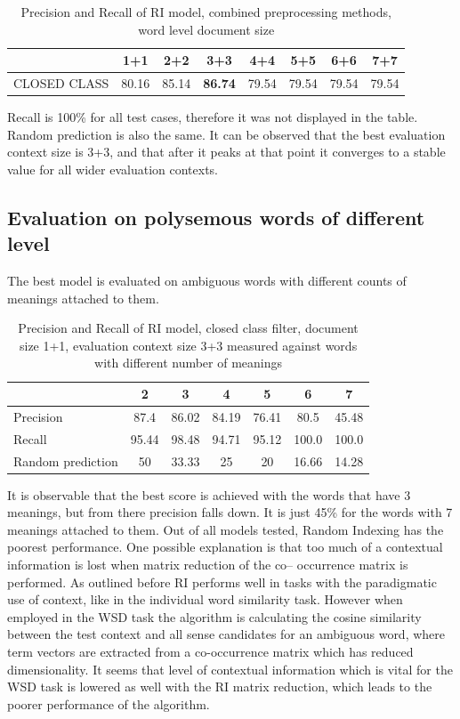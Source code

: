 \begin{table}[h!]
\begin{tabular}{ l | c c c c c c c}
    &  1+1 & 2+2 & 3+3 & 4+4 & 5+5 & 6+6 & 7+7 \\
\hline
CLOSED CLASS  & 80.16 & 85.14 & \textbf{86.74} & 79.54 & 79.54& 79.54& 79.54\\
\end{tabular}
\caption{Precision and Recall of RI model,  combined preprocessing methods, word level document size}
\end{table} 

Recall is 100\% for all test cases, therefore it was not displayed in the table. Random prediction is also the same. 
It can be observed that the best evaluation context size is 3+3, and that after it peaks at that point it converges to a stable value for all wider evaluation contexts. 



\subsection{Evaluation on polysemous words of different level}
The best model is evaluated on ambiguous words with 
different counts of meanings attached to them.

\begin{table}[h!]
\begin{tabular}{ l | c c c c c c  }
     & 2 & 3 & 4 & 5 & 6& 7     \\
 \hline
Precision & 87.4 & 86.02 & 84.19 & 76.41 &80.5 & 45.48 \\
Recall   & 95.44 & 98.48 & 94.71 & 95.12 & 100.0 &100.0    \\
Random prediction    & 50 & 33.33 & 25 & 20 & 16.66 & 14.28      \\
\end{tabular}
\caption{Precision and Recall of RI model, closed class filter, document size 1+1, evaluation context size 3+3 measured against words with different number of meanings}
\end{table} 
 It is observable that the best score is achieved with the words that have 3 meanings, but from there precision falls down. It is 
just 45\% for the words with 7 meanings attached to them. Out of all models tested, Random Indexing has the poorest 
performance. One possible explanation is that too much of a contextual information is lost when matrix reduction of the co--
occurrence matrix is performed. As outlined before RI performs well in tasks with the paradigmatic use of context, like in the 
individual word similarity task. However when employed in the WSD task the algorithm is calculating the cosine similarity between the test 
context and all sense candidates for an ambiguous word, where term vectors are extracted from a co-occurrence matrix which has reduced dimensionality. 
It seems that level of contextual information which is vital for the WSD task is lowered as well with the RI matrix reduction, which leads to the poorer performance of the algorithm. 
